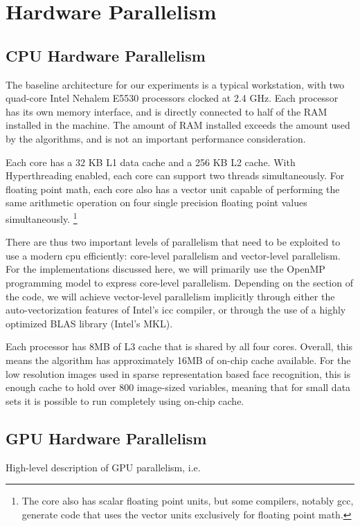 \documentclass[10pt,twocolumn,letterpaper]{article}
\begin{document}
\section{Hardware Parallelism} 

\subsection{CPU Hardware Parallelism} 
The baseline architecture for our experiments is a typical workstation,
with two quad-core Intel Nehalem E5530 processors clocked at 2.4 GHz.  Each
processor has its own memory interface, and is directly connected to half of
the RAM installed in the machine.  The amount of RAM installed exceeds the
amount used by the algorithms, and is not an important performance
consideration.  

Each core has a 32 KB L1 data cache and a 256 KB L2 cache. With Hyperthreading
enabled, each core can support two threads simultaneously.  For floating point
math, each core also has a vector unit capable of performing the same
arithmetic operation on four single precision floating point values
simultaneously.  \footnote{The core also has scalar floating point units, but
some compilers, notably gcc, generate code that uses the vector units
exclusively for floating point math.} 

There are thus two important levels of parallelism that need to be exploited to
use a modern cpu efficiently: core-level parallelism and vector-level
parallelism.  For the implementations discussed here, we will primarily use the
OpenMP programming model to express core-level parallelism.  Depending on the
section of the code, we will achieve vector-level parallelism implicitly
through either the auto-vectorization features of Intel's icc compiler, or
through the use of a highly optimized BLAS library (Intel's MKL).

Each processor has 8MB of L3 cache that is shared by all four cores.  Overall,
this means the algorithm has approximately 16MB of on-chip cache available.
For the low resolution images used in sparse representation based face
recognition, this is enough cache to hold over 800 image-sized variables,
meaning that for small data sets it is possible to run completely using on-chip
cache.

\subsection{GPU Hardware Parallelism}
High-level description of GPU parallelism, i.e.
\end{document}
